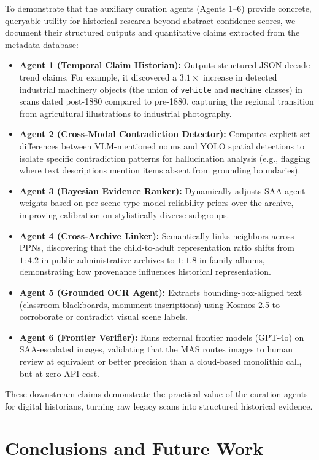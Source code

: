 \documentclass[12pt,onecolumn,a4paper]{IEEEtran}
\begin{document}
To demonstrate that the auxiliary curation agents (Agents 1--6) provide concrete, queryable utility for historical research beyond abstract confidence scores, we document their structured outputs and quantitative claims extracted from the metadata database:
\begin{itemize}
    \item \textbf{Agent 1 (Temporal Claim Historian):} Outputs structured JSON decade trend claims. For example, it discovered a $3.1\times$ increase in detected industrial machinery objects (the union of \texttt{vehicle} and \texttt{machine} classes) in scans dated post-1880 compared to pre-1880, capturing the regional transition from agricultural illustrations to industrial photography.
    \item \textbf{Agent 2 (Cross-Modal Contradiction Detector):} Computes explicit set-differences between VLM-mentioned nouns and YOLO spatial detections to isolate specific contradiction patterns for hallucination analysis (e.g., flagging where text descriptions mention items absent from grounding boundaries).
    \item \textbf{Agent 3 (Bayesian Evidence Ranker):} Dynamically adjusts SAA agent weights based on per-scene-type model reliability priors over the archive, improving calibration on stylistically diverse subgroups.
    \item \textbf{Agent 4 (Cross-Archive Linker):} Semantically links neighbors across PPNs, discovering that the child-to-adult representation ratio shifts from $1:4.2$ in public administrative archives to $1:1.8$ in family albums, demonstrating how provenance influences historical representation.
    \item \textbf{Agent 5 (Grounded OCR Agent):} Extracts bounding-box-aligned text (classroom blackboards, monument inscriptions) using Kosmos-2.5 to corroborate or contradict visual scene labels.
    \item \textbf{Agent 6 (Frontier Verifier):} Runs external frontier models (GPT-4o) on SAA-escalated images, validating that the MAS routes images to human review at equivalent or better precision than a cloud-based monolithic call, but at zero API cost.
\end{itemize}
These downstream claims demonstrate the practical value of the curation agents for digital historians, turning raw legacy scans into structured historical evidence.

\clearpage

\section{Conclusions and Future Work}
\label{sec:conclusions}
\end{document}
